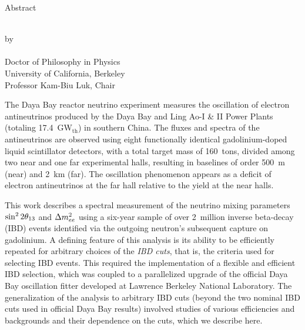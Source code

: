 
\begin{center}
  Abstract

  \vspace{\baselineskip}
  \MyTitle\\
  \vspace{\baselineskip} by\\
  \vspace{\baselineskip} \MyAuthor\\
  \vspace{\baselineskip} Doctor of Philosophy in Physics\\
  \vspace{\baselineskip} University of California, Berkeley\\
  \vspace{\baselineskip} Professor Kam-Biu Luk, Chair
  \vspace{\baselineskip}
\end{center}

\noindent
%
The Daya Bay reactor neutrino experiment measures the oscillation of electron antineutrinos produced by the Daya Bay and Ling Ao-I \& II Power Plants (totaling 17.4~GW$_\mathrm{th}$) in southern China. The fluxes and spectra of the antineutrinos are observed using eight functionally identical gadolinium-doped liquid scintillator detectors, with a total target mass of 160~tons, divided among two near and one far experimental halls, resulting in baselines of order 500~m (near) and 2~km (far). The oscillation phenomenon appears as a deficit of electron antineutrinos at the far hall relative to the yield at the near halls.

This work describes a spectral measurement of the neutrino mixing parameters $\sin^2 2\theta_{13}$ and $\Delta m^2_{ee}$ using a six-year sample of over 2~million inverse beta-decay (IBD) events identified via the outgoing neutron's subsequent capture on gadolinium. A defining feature of this analysis is its ability to be efficiently repeated for arbitrary choices of the \emph{IBD cuts}, that is, the criteria used for selecting IBD events. This required the implementation of a flexible and efficient IBD selection, which was coupled to a parallelized upgrade of the official Daya Bay oscillation fitter developed at Lawrence Berkeley National Laboratory. The generalization of the analysis to arbitrary IBD cuts (beyond the two nominal IBD cuts used in official Daya Bay results) involved studies of various efficiencies and backgrounds and their dependence on the cuts, which we describe here.

